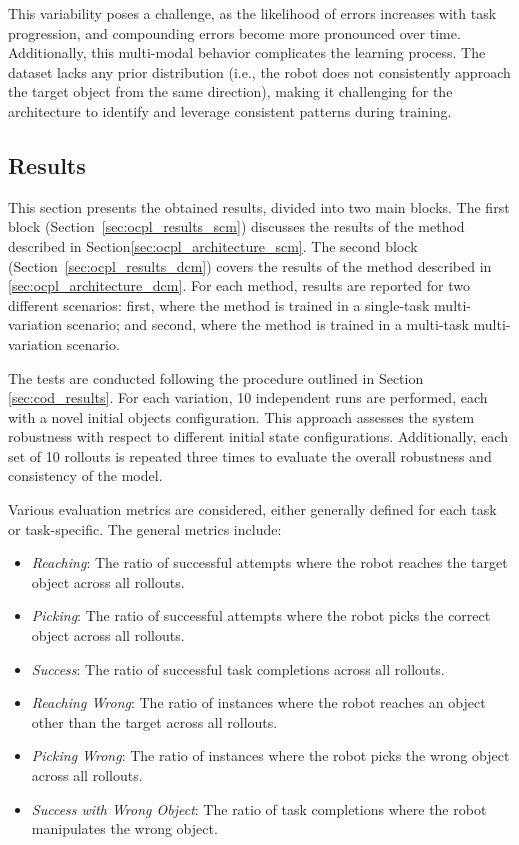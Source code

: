 This variability poses a challenge, as the likelihood of errors increases with task progression, and compounding errors become more pronounced over time. Additionally, this multi-modal behavior complicates the learning process. The dataset lacks any prior distribution (i.e., the robot does not consistently approach the target object from the same direction), making it challenging for the architecture to identify and leverage consistent patterns during training.

\subsection{Results}
\label{sec:ocpl_results}
This section presents the obtained results, divided into two main blocks. The first block (Section~\ref{sec:ocpl_results_scm}) discusses the results of the method described in Section\ref{sec:ocpl_architecture_scm}. The second block (Section~\ref{sec:ocpl_results_dcm}) covers the results of the method described in \ref{sec:ocpl_architecture_dcm}. For each method, results are reported for two different scenarios: first, where the method is trained in a single-task multi-variation scenario; and second, where the method is trained in a multi-task multi-variation scenario.

The tests are conducted following the procedure outlined in Section \ref{sec:cod_results}. For each variation, 10 independent runs are performed, each with a novel initial objects configuration. This approach assesses the system robustness with respect to different initial state configurations. Additionally, each set of 10 rollouts is repeated three times to evaluate the overall robustness and consistency of the model.

Various evaluation metrics are considered, either generally defined for each task or task-specific. The general metrics include:

\begin{itemize}
    \item \textit{Reaching}: The ratio of successful attempts where the robot reaches the target object across all rollouts.
    \item \textit{Picking}: The ratio of successful attempts where the robot picks the correct object across all rollouts.
    \item \textit{Success}: The ratio of successful task completions across all rollouts.
    \item \textit{Reaching Wrong}: The ratio of instances where the robot reaches an object other than the target across all rollouts.
    \item \textit{Picking Wrong}: The ratio of instances where the robot picks the wrong object across all rollouts.
    \item \textit{Success with Wrong Object}: The ratio of task completions where the robot manipulates the wrong object.
\end{itemize}


